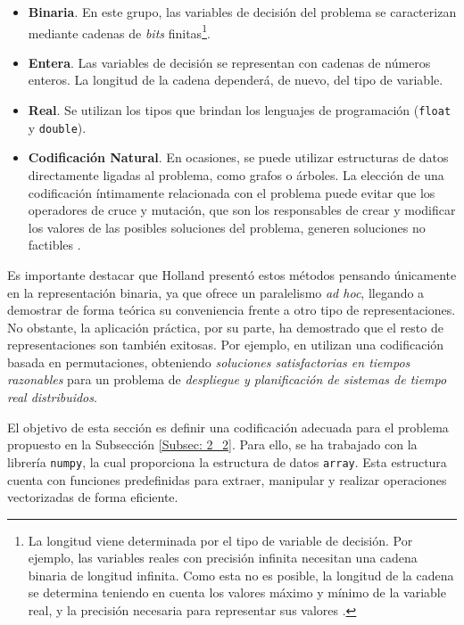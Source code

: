 \documentclass[12pt,a4paper]{book}
\begin{document}
\begin{itemize}
	\item \textbf{Binaria}. En este grupo, las variables de decisión del problema se caracterizan mediante cadenas de \textsl{bits} finitas\footnote{La longitud viene determinada por el tipo de variable de decisión. Por ejemplo, las variables reales con precisión infinita necesitan una cadena binaria de longitud infinita. Como esta no es posible, la longitud de la cadena se determina teniendo en cuenta los valores máximo y mínimo de la
variable real, y la precisión necesaria para representar sus valores \cite{e_besada_optimizacion_nodate}.}.
	\item \textbf{Entera}. Las variables de decisión se representan con cadenas de números enteros. La longitud de la cadena dependerá, de nuevo, del tipo de variable. 
	\item \textbf{Real}. Se utilizan los tipos que brindan los lenguajes de programación (\texttt{float} y \texttt{double}). 
	\item \textbf{Codificación Natural}. En ocasiones, se puede utilizar estructuras de datos directamente ligadas al problema, como grafos o árboles. La elección de una codificación íntimamente relacionada con el problema puede evitar que los operadores de cruce y mutación, que son los responsables de crear y modificar los valores de las posibles soluciones del problema, generen soluciones no factibles \cite{e_besada_optimizacion_nodate}.
\end{itemize}

Es importante destacar que Holland presentó estos métodos pensando únicamente en la representación binaria, ya que ofrece un paralelismo \textsl{ad hoc}, llegando a demostrar de forma teórica su conveniencia frente a otro tipo de representaciones. No obstante, la aplicación práctica, por su parte, ha demostrado que el resto de representaciones son también exitosas. Por ejemplo, en \cite{azketa_algoritmo_2013} utilizan una codificación basada en permutaciones, obteniendo \textsl{soluciones satisfactorias en tiempos
razonables} para un problema de \textsl{despliegue y planificación de sistemas de tiempo real distribuidos}.   

El objetivo de esta sección es definir una codificación adecuada para el problema propuesto en la Subsección \ref{Subsec: 2_2}. Para ello, se ha trabajado con la librería \texttt{numpy}, la cual proporciona la estructura de datos \texttt{array}. Esta estructura cuenta con funciones predefinidas para extraer, manipular y realizar operaciones vectorizadas de forma eficiente.
\end{document}
